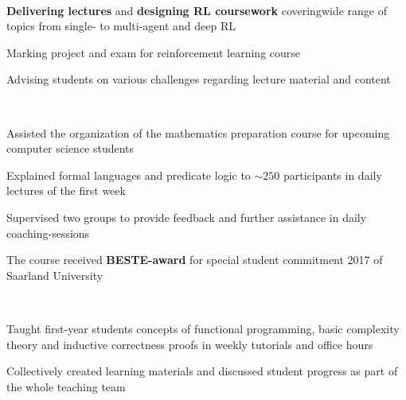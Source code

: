 \documentclass[]{lukas-cv-openfont}
\begin{document}

\noindent
{}
\\
\begin{tightitemize}{1.7em}
    \item \textbf{Delivering lectures} and \textbf{designing RL coursework} coveringwide range of topics from single- to multi-agent and deep RL
    \item Marking project and exam for reinforcement learning course
    \item Advising students on various challenges regarding lecture material and content
\end{tightitemize}
\largesectionsep

\noindent
{}
\\
\begin{tightitemize}{1.7em}
    \item Assisted the organization of the mathematics preparation course for upcoming computer science students%
    \item Explained formal languages and predicate logic to $\sim250$ participants in daily lectures of the first week
    \item Supervised two groups to provide feedback and further assistance in daily coaching-sessions
    \item The course received \textbf{BESTE-award} for special student commitment 2017 of Saarland University
\end{tightitemize}
\largesectionsep

\noindent
{}
\\
\begin{tightitemize}{1.7em}
    \item Taught first-year students concepts of functional programming, basic complexity theory and inductive correctness proofs in weekly tutorials and office hours
    \item Collectively created learning materials and discussed student progress as part of the whole teaching team
\end{tightitemize}
\largesectionsep
\end{document}
